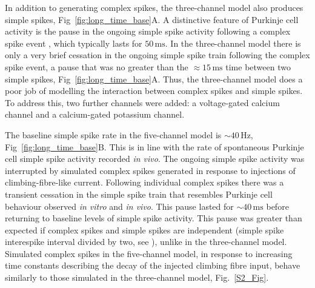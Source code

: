 \documentclass[utf8]{frontiersSCNS} %
\newcommand{\mse}{\,\mathrm{ms}}
\newcommand{\hz}{\,\mathrm{Hz}}
\begin{document}
In addition to generating complex spikes, the three-channel model also
produces simple spikes, Fig~\ref{fig:long_time_base}A. A distinctive
feature of Purkinje cell activity is the pause in the ongoing simple
spike activity following a complex spike event \cite{BellGrimm1969,GranitPhillips1956,Thach1967}, which typically lasts for
$50\mse$. In the three-channel model there is only a very brief
cessation in the ongoing simple spike train following the complex
spike event, a pause that was no greater than the $\approx 15\mse$
time between two simple spikes, Fig~\ref{fig:long_time_base}A. Thus,
the three-channel model does a poor job of modelling the interaction
between complex spikes and simple spikes. To address this, two further
channels were added: a voltage-gated calcium channel and a
calcium-gated potassium channel.



The baseline simple spike rate in the five-channel model is $\sim
40\hz$, Fig~\ref{fig:long_time_base}B. This is in line with the rate
of spontaneous Purkinje cell simple spike activity recorded \textit{in
  vivo}.  The ongoing simple spike activity was interrupted by
simulated complex spikes generated in response to injections of
climbing-fibre-like current. Following individual complex spikes there
was a transient cessation in the simple spike train that resembles Purkinje cell
behaviour observed \textit{in vitro} and \textit{in vivo}. This pause
lasted for $\sim 40\mse$ before returning to baseline levels of simple
spike activity. This pause was greater than expected if complex spikes and simple spikes are independent (simple spike interespike interval divided by two, see \cite{XiaoEtAl2014}), unlike in the three-channel model. Simulated complex spikes in the five-channel model, in response to increasing time constants describing the decay of the injected climbing fibre input, behave similarly to those simulated in the three-channel model, Fig.~\ref{S2_Fig}. 
\end{document}
